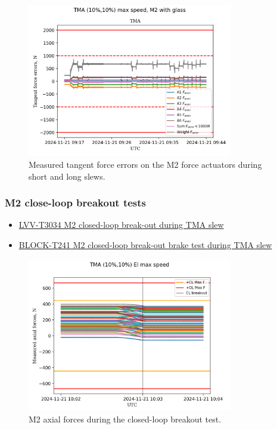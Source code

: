 \begin{figure}
    \centering
    \includegraphics[width=0.8\textwidth]{spa/M2_short_long_slews_tangent_force_errors_10.png}
    \caption{Measured tangent force errors on the M2 force actuators during short and long slews.}
    \label{fig:m2_short_long_slews_tangent_errors}
    \end{figure}


\subsubsection{M2 close-loop breakout tests}
\label{subsubsec:m2_close_loop_breakout_tests}

\begin{itemize}
    \item \href{https://rubinobs.atlassian.net/projects/LVV?selectedItem=com.atlassian.plugins.atlassian-connect-plugin:com.kanoah.test-manager__main-project-page#!/v2/testCase/LVV-T3034}{LVV-T3034 M2 closed-loop break-out during TMA slew}
    \item \href{https://rubinobs.atlassian.net/projects/BLOCK?selectedItem=com.atlassian.plugins.atlassian-connect-plugin:com.kanoah.test-manager__main-project-page#!/v2/testCase/BLOCK-T241}{BLOCK-T241 M2 closed-loop break-out brake test during TMA slew}
\end{itemize}

\begin{figure}
    \centering
    \includegraphics[width=0.8\textwidth]{spa/M2_cl_breakout_10_axial_force.png}
    \caption{M2 axial forces during the closed-loop breakout test.}
    \label{fig:m2_closed_loop_breakout_axial_force}
    \end{figure}

